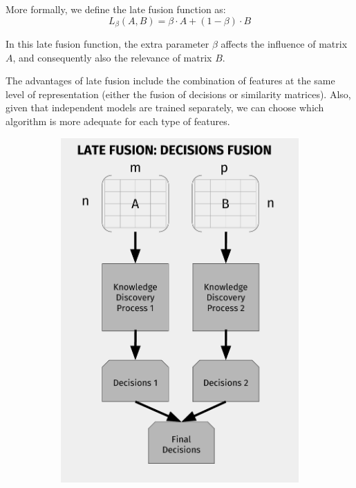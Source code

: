 More formally, we define the late fusion function as:
\begin{equation} \label{eq:late-fusion}
L_\beta(A,B) = \beta \cdot A + (1 - \beta)\cdot B
\end{equation}

In this late fusion function, the extra parameter $\beta$ affects the influence of matrix $A$,  and consequently also the relevance of matrix $B$.


The advantages of late fusion include the combination of features at the same level of representation (either the fusion of decisions or similarity matrices). Also, given that independent models are trained separately, we can choose which algorithm is more adequate for each type of features. 



\begin{figure}
	\centering
	\begin{subfigure}[t]{.5\textwidth}
	\centering
	\includegraphics[width=0.9\linewidth]{images/Chapitre3/lf1_diag.pdf}

\end{subfigure}
\end{figure}
